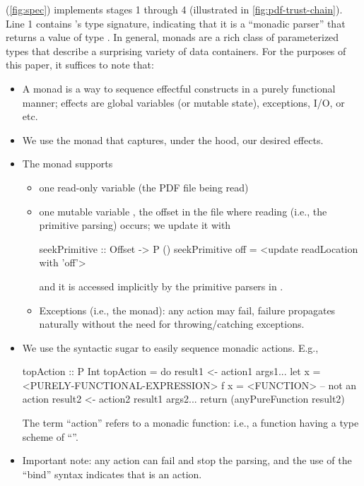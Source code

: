  (\cref{fig:spec}) implements stages 1 through 4 (illustrated in \cref{fig:pdf-trust-chain}).
% 
Line 1 contains 's type signature, indicating that it
is a ``monadic parser''  that returns a value of type
.
%
In general, monads are a rich class of parameterized types that
describe a surprising variety of data containers.
%
For the purposes of this paper, it suffices to note that:
\begin{itemize}
  \item A monad is a way to sequence effectful constructs in a purely
    functional manner; effects are global variables (or mutable
    state), exceptions, I/O, or etc.
  \item We use the  monad
    that captures, under the hood, our desired effects.
  \item The  monad supports
    \begin{itemize}
    \item one read-only variable (the PDF file being read)
    \item one mutable variable \rdloc{}, the offset in the file where
      reading (i.e., the primitive parsing) occurs; we update it
      with
  \begin{codeNoExecute}
  seekPrimitive :: Offset -> P ()
  seekPrimitive off = <update readLocation with 'off'>
  \end{codeNoExecute}
        and it is accessed
      implicitly by the primitive parsers in .
    \item Exceptions (i.e., the  monad): any action
      may fail, failure propagates naturally without the need for
      throwing/catching exceptions.
    \end{itemize}
\item We use the  syntactic sugar to easily sequence
  monadic actions.
  E.g.,
  \begin{codeNoExecute}
  topAction :: P Int
  topAction = do
              result1 <- action1 args1...
              let x = <PURELY-FUNCTIONAL-EXPRESSION>
                  f x = <FUNCTION> -- not an action
              result2 <- action2 result1 args2...
              return (anyPureFunction result2)
  \end{codeNoExecute}
  The term ``action'' refers to a monadic function: i.e., a function
  having a type scheme of ``''.
\item Important note: any action can fail and stop the parsing,
  and the use of the  ``bind'' syntax indicates
  that  is an action.
\end{itemize}

